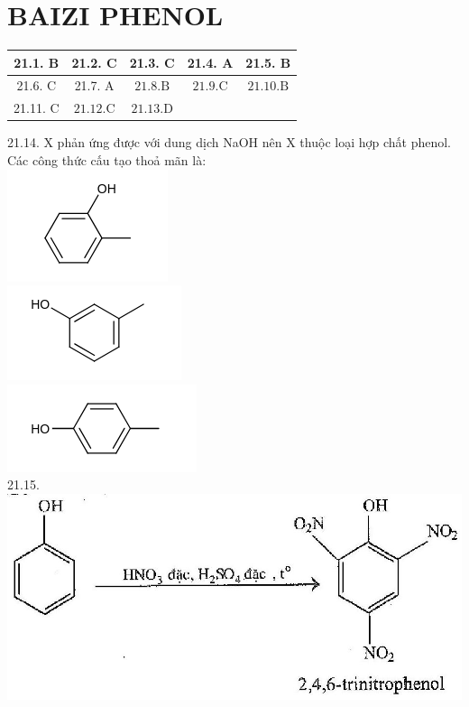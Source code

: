 \documentclass[10pt]{article}
\begin{document}
\section*{BAIZI PHENOL}
\begin{center}
\begin{tabular}{|c|c|c|c|c|}
\hline
21.1. B & 21.2. C & 21.3. C & 21.4. A & 21.5. B \\
\hline
21.6. C & 21.7. A & $21.8 . \mathrm{B}$ & $21.9 . \mathrm{C}$ & $21.10 . \mathrm{B}$ \\
\hline
21.11. C & $21.12 . \mathrm{C}$ & $21.13 . \mathrm{D}$ &  &  \\
\hline
\end{tabular}
\end{center}

21.14. X phản ứng được với dung dịch NaOH nên X thuộc loại hợp chất phenol. Các công thức cấu tạo thoả mãn là:\\
\includegraphics{smile-bd08b372b08ac46efa7951e96fddc24ed12fde34}\\
\includegraphics{smile-d5fa16a10bdd7fce77766f1c8f76bbee4364b597}\\
\includegraphics{smile-10cb4ba86cd355bd05a2a3f096ee58b5e46c4b7e}\\
21.15.\\
\includegraphics[max width=\textwidth, center]{2025_10_23_ed7118e3280f74e91193g-34}
\end{document}
